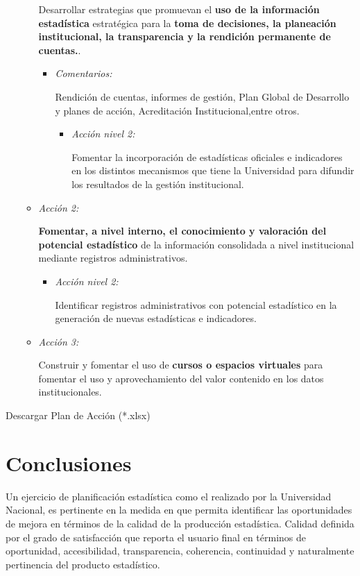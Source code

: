 \documentclass[
]{book}
\begin{document}
\begin{itemize}
\begin{itemize}
    Desarrollar estrategias que promuevan el \textbf{uso de la información estadística} estratégica para la \textbf{toma de decisiones, la planeación institucional, la transparencia y la rendición permanente de cuentas.}.

    \begin{itemize}
    \item
      \emph{Comentarios:}

      Rendición de cuentas, informes de gestión, Plan Global de Desarrollo y planes de acción, Acreditación Institucional,entre otros.

      \begin{itemize}
      \item
        \emph{Acción nivel 2:}

        Fomentar la incorporación de estadísticas oficiales e indicadores en los distintos mecanismos que tiene la Universidad para difundir los resultados de la gestión institucional.
      \end{itemize}
    \end{itemize}
  \item
    \emph{Acción 2:}

    \textbf{Fomentar, a nivel interno, el conocimiento y valoración del potencial estadístico} de la información consolidada a nivel institucional mediante registros administrativos.

    \begin{itemize}
    \item
      \emph{Acción nivel 2:}

      Identificar registros administrativos con potencial estadístico en la generación de nuevas estadísticas e indicadores.
    \end{itemize}
  \item
    \emph{Acción 3:}

    Construir y fomentar el uso de \textbf{cursos o espacios virtuales} para fomentar el uso y aprovechamiento del valor contenido en los datos institucionales.
  \end{itemize}
\end{itemize}

Descargar Plan de Acción (*.xlsx)

\hypertarget{conclusiones}{%
\chapter{Conclusiones}\label{conclusiones}}

Un ejercicio de planificación estadística como el realizado por la Universidad Nacional, es pertinente en la medida en que permita identificar las oportunidades de mejora en términos de la calidad de la producción estadística. Calidad definida por el grado de satisfacción que reporta el usuario final en términos de oportunidad, accesibilidad, transparencia, coherencia, continuidad y naturalmente pertinencia del producto estadístico.
\end{document}
